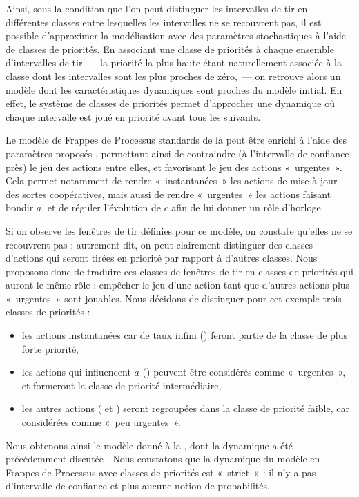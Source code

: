 Ainsi, sous la condition que l'on peut distinguer les intervalles de tir en différentes classes
entre lesquelles les intervalles ne se recouvrent pas,
il est possible d'approximer la modélisation avec des paramètres stochastiques à
l'aide de classes de priorités.
En associant une classe de priorités à chaque ensemble d'intervalles de tir
---~la priorité la plus haute étant naturellement associée à la classe dont les intervalles
sont les plus proches de zéro,~---
on retrouve alors un modèle dont les caractéristiques dynamiques sont proches
du modèle initial.
En effet, le système de classes de priorités permet d'approcher une dynamique où
chaque intervalle est joué en priorité avant tous les suivants.

\begin{example}
  Le modèle de Frappes de Processus standards de la 
  peut être enrichi à l'aide des paramètres proposés ,
  permettant ainsi
  de contraindre (à l'intervalle de confiance près) le jeu des actions entre elles,
  et favorisant le jeu des actions «~urgentes~».
  Cela permet notamment de rendre «~instantanées~»
  les actions de mise à jour des sortes coopératives,
  mais aussi de rendre «~urgentes~» les actions faisant bondir $a$,
  et de réguler l'évolution de $c$ afin de lui donner un rôle d'horloge.
  
  Si on observe les fenêtres de tir définies pour ce modèle, on constate qu'elles
  ne se recouvrent pas ; autrement dit, on peut clairement distinguer des classes
  d'actions qui seront tirées en priorité par rapport à d'autres classes.
  Nous proposons donc de traduire ces classes de fenêtres de tir en classes de priorités
  qui auront le même rôle : empêcher le jeu d'une action tant que d'autres actions
  plus «~urgentes~» sont jouables.
  Nous décidons de distinguer pour cet exemple trois classes de priorités :
  \begin{itemize}
    \item les actions instantanées car de taux infini (\stochainf) feront partie de la classe de
      plus forte priorité,
    \item les actions qui influencent $a$ (\stochaa) peuvent être considérés comme «~urgentes~»,
      et formeront la classe de priorité intermédiaire,
    \item les autres actions (\stochab{} et \stochac) seront regroupées dans la classe de priorité faible,
      car considérées comme «~peu urgentes~».
  \end{itemize}
  Nous obtenons ainsi le modèle donné à la ,
  dont la dynamique a été précédemment discutée .
  Nous constatons que la dynamique du modèle en Frappes de Processus avec classes de priorités
  est «~strict~» : il n'y a pas d'intervalle de confiance et plus aucune notion de probabilités.
\end{example}


